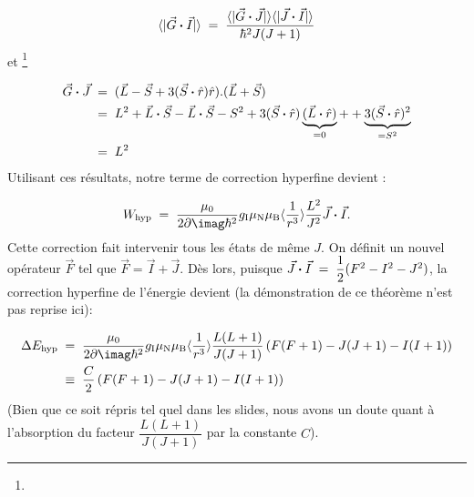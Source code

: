 \[
    \langle |\vec{G}\boldsymbol{\cdot}\vec{I}| \rangle \; = \;  \dfrac{\langle |\vec{G}\boldsymbol{\cdot}\vec{J}| \rangle\langle |\vec{J}\boldsymbol{\cdot}\vec{I}| \rangle}{\hbar^2J(J+1)}
\]
et \footnote{}

\begin{align*}
    \vec{G}\boldsymbol{\cdot}\vec{J}
    &\; = \;  (\vec{L}-\vec{S}+3(\vec{S}\boldsymbol{\cdot}\hat{r})\hat{r}).(\vec{L}+\vec{S})\\
    &\; = \; L^2 + \vec{L}\boldsymbol{\cdot}\vec{S} -\vec{L}\boldsymbol{\cdot}\vec{S} - S^2 + 3 (\vec{S}\boldsymbol{\cdot}\hat{r})\underbrace{(\vec{L}\boldsymbol{\cdot}\hat{r})}_{= 0} + +\underbrace{3(\vec{S}\boldsymbol{\cdot}\hat{r})^2}_{=S^2}\\
    &\; = \;  L^2
\end{align*}
Utilisant ces résultats, notre terme de correction hyperfine devient :

\begin{equation}
    W_\text{hyp} \eq  \dfrac{\mu_0}{2\p\imag\hbar^2}g_\text{I}\mu_\text{N}\mu_\text{B}\langle\dfrac{1}{r^3}\rangle \dfrac{L^2}{J^2}\vec{J}\Cdot\vec{I}.
\end{equation}
Cette correction fait intervenir tous les états de même $J$. On définit un nouvel opérateur $\vec{F}$ tel que $\vec{F} = \vec{I} + \vec{J}$. Dès lors, puisque $\vec{J}\boldsymbol{\cdot}\vec{I} \; = \;  \dfrac{1}{2}(F^2-I^2-J^2)$, la correction hyperfine  de l'énergie devient (la démonstration de ce théorème n'est pas reprise ici):

\begin{align*}
    \Delta E_\text{hyp} &\eq  \dfrac{\mu_0}{2\p\imag\hbar^2}g_\text{I}\mu_\text{N}\mu_\text{B}\langle\dfrac{1}{r^3}\rangle\dfrac{L(L+1)}{J(J+1)}\left( F(F+1) - J(J+1) - I(I+1) \right)\\
    &\;\equiv\;
    \dfrac{C}{2} \left( F(F+1) - J(J+1) - I(I+1) \right)
\end{align*}
(Bien que ce soit répris tel quel dans les slides, nous avons un doute quant à l'absorption du facteur $\dfrac{L(L+1)}{J(J+1)}$ par la constante $C$).

